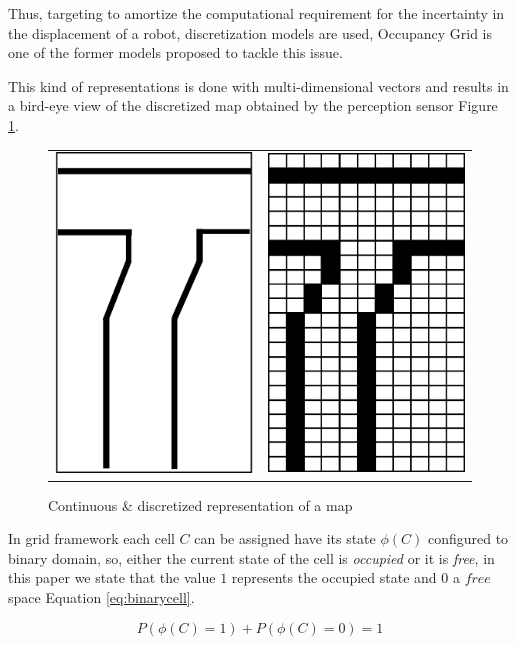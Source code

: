 Thus, targeting to amortize the computational requirement for the incertainty in the displacement of a robot, discretization models are used, Occupancy Grid\cite{Elfes:1989:UOG:68491.68495} is one of the former models proposed to tackle this issue.

This kind of representations is done with multi-dimensional vectors and results in a bird-eye view of the discretized map obtained by the perception sensor Figure \ref{fig:grid:continuous:discretized}.


\begin{figure}[H]
\centering
	\begin{tabular}{lr}\\
		\includegraphics[width=0.25\columnwidth]{img/fig:grid:continuous} &
		\includegraphics[width=0.25\columnwidth]{img/fig:grid:discretized}
	\end{tabular}
	\caption{Continuous \& discretized representation of a map}
	\label{fig:grid:continuous:discretized}
\end{figure}


In grid framework each cell $C$ can be assigned have its state $\phi(C)$ configured to binary domain, so, either the current state of the cell is \textit{occupied} or it is \textit{free}, in this paper we state that the value $1$ represents the occupied state and $0$ a $free$ space Equation \ref{eq:binarycell}.

\begin{equation}
P(\phi(C)=1) + P(\phi(C)=0) = 1
\label{eq:binarycell}
\end{equation}

